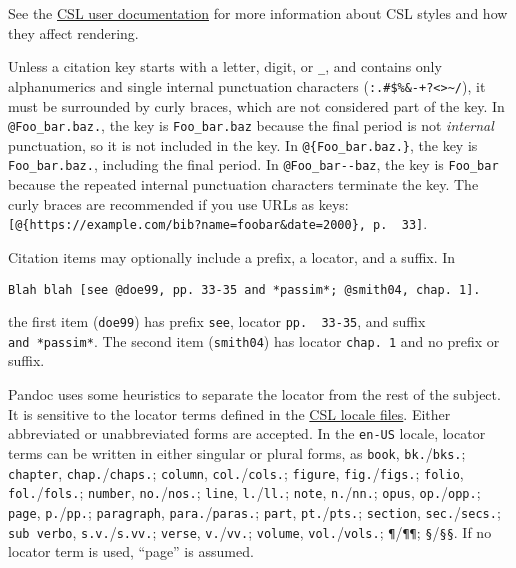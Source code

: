 \documentclass[
]{article}
\begin{document}
See the \href{https://citationstyles.org/authors/}{CSL user
documentation} for more information about CSL styles and how they affect
rendering.

Unless a citation key starts with a letter, digit, or \texttt{\_}, and
contains only alphanumerics and single internal punctuation characters
(\texttt{:.\#\$\%\&-+?\textless{}\textgreater{}\textasciitilde{}/}), it
must be surrounded by curly braces, which are not considered part of the
key. In \texttt{@Foo\_bar.baz.}, the key is \texttt{Foo\_bar.baz}
because the final period is not \emph{internal} punctuation, so it is
not included in the key. In \texttt{@\{Foo\_bar.baz.\}}, the key is
\texttt{Foo\_bar.baz.}, including the final period. In
\texttt{@Foo\_bar-\/-baz}, the key is \texttt{Foo\_bar} because the
repeated internal punctuation characters terminate the key. The curly
braces are recommended if you use URLs as keys:
\texttt{{[}@\{https://example.com/bib?name=foobar\&date=2000\},\ p.\ \ 33{]}}.

Citation items may optionally include a prefix, a locator, and a suffix.
In

\begin{verbatim}
Blah blah [see @doe99, pp. 33-35 and *passim*; @smith04, chap. 1].
\end{verbatim}

the first item (\texttt{doe99}) has prefix \texttt{see}, locator
\texttt{pp.\ \ 33-35}, and suffix \texttt{and\ *passim*}. The second
item (\texttt{smith04}) has locator \texttt{chap.\ 1} and no prefix or
suffix.

Pandoc uses some heuristics to separate the locator from the rest of the
subject. It is sensitive to the locator terms defined in the
\href{https://github.com/citation-style-language/locales}{CSL locale
files}. Either abbreviated or unabbreviated forms are accepted. In the
\texttt{en-US} locale, locator terms can be written in either singular
or plural forms, as \texttt{book}, \texttt{bk.}/\texttt{bks.};
\texttt{chapter}, \texttt{chap.}/\texttt{chaps.}; \texttt{column},
\texttt{col.}/\texttt{cols.}; \texttt{figure},
\texttt{fig.}/\texttt{figs.}; \texttt{folio},
\texttt{fol.}/\texttt{fols.}; \texttt{number},
\texttt{no.}/\texttt{nos.}; \texttt{line}, \texttt{l.}/\texttt{ll.};
\texttt{note}, \texttt{n.}/\texttt{nn.}; \texttt{opus},
\texttt{op.}/\texttt{opp.}; \texttt{page}, \texttt{p.}/\texttt{pp.};
\texttt{paragraph}, \texttt{para.}/\texttt{paras.}; \texttt{part},
\texttt{pt.}/\texttt{pts.}; \texttt{section},
\texttt{sec.}/\texttt{secs.}; \texttt{sub\ verbo},
\texttt{s.v.}/\texttt{s.vv.}; \texttt{verse}, \texttt{v.}/\texttt{vv.};
\texttt{volume}, \texttt{vol.}/\texttt{vols.}; \texttt{¶}/\texttt{¶¶};
\texttt{§}/\texttt{§§}. If no locator term is used, ``page'' is assumed.
\end{document}

